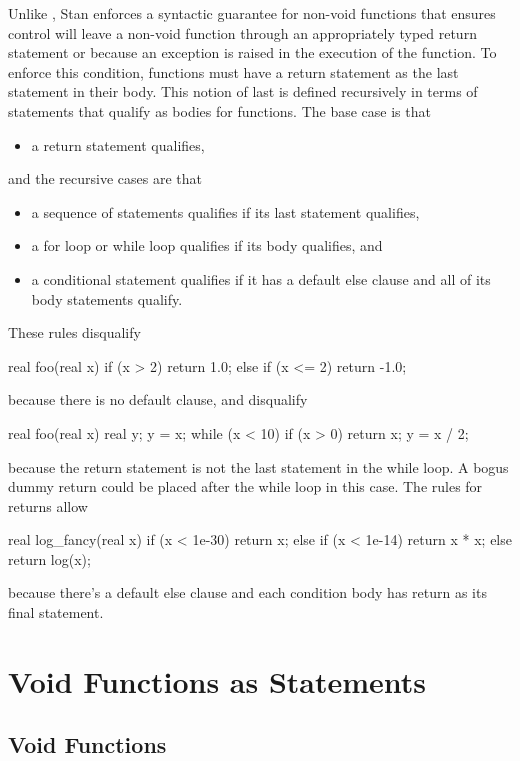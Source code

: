 Unlike \Cpp, Stan enforces a syntactic guarantee for non-void
functions that ensures control will leave a non-void function through
an appropriately typed return statement or because an exception is
raised in the execution of the function.  To enforce this condition,
functions must have a return statement as the last statement in their
body.  This notion of last is defined recursively in terms of
statements that qualify as bodies for functions.  The base case is that
%
\begin{itemize}
\item a return statement qualifies,
\end{itemize}
%
and the recursive cases are that
%
\begin{itemize}
\item a sequence of statements qualifies if its last statement
  qualifies,
\item a for loop or while loop qualifies if its body qualifies, and
\item a conditional statement qualifies if it has a default else
  clause and all of its body statements qualify.
\end{itemize}
%
These rules disqualify
%
\begin{stancode}
real foo(real x) {
  if (x > 2) return 1.0;
  else if (x <= 2) return -1.0;
}
\end{stancode}
%
because there is no default  clause, and
disqualify
%
\begin{stancode}
real foo(real x) {
  real y;
  y = x;
  while (x < 10) {
    if (x > 0) return x;
    y = x / 2;
  }
}
\end{stancode}
%
because the return statement is not the last statement in the while
loop.  A bogus dummy return could be placed after the while loop in
this case.  The rules for returns allow
%
\begin{stancode}
real log_fancy(real x) {
  if (x < 1e-30)
    return x;
  else if (x < 1e-14)
    return x * x;
  else
    return log(x);
}
\end{stancode}
%
because there's a default else clause and each condition body has
return as its final statement.


\section{Void Functions as Statements}

\subsection{Void Functions}

